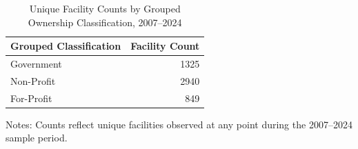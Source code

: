\documentclass{article}
\begin{document}
\begin{table}[htbp]
\centering
\caption{Unique Facility Counts by Grouped Ownership Classification, 2007--2024}
\label{tab:grouped_counts}

\begin{threeparttable}
\begin{tabular}{lr}
\toprule
Grouped Classification & Facility Count \\
\midrule
Government & 1325 \\
Non-Profit & 2940 \\
For-Profit & 849 \\
\bottomrule
\end{tabular}


\begin{tablenotes}[flushleft]
\footnotesize
\item Notes:
Counts reflect unique facilities observed at any point
during the 2007--2024 sample period.
\end{tablenotes}

\end{threeparttable}
\end{table}
\end{document}
